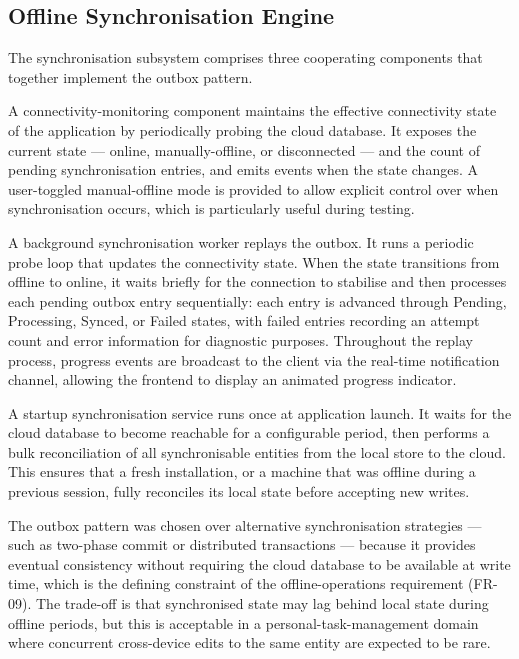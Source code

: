 \subsection{Offline Synchronisation Engine}\label{sec:meth_sync}

The synchronisation subsystem comprises three cooperating components that
together implement the outbox pattern.

A connectivity-monitoring component maintains the effective connectivity state
of the application by periodically probing the cloud database. It exposes the
current state --- online, manually-offline, or disconnected --- and the count
of pending synchronisation entries, and emits events when the state changes.
A user-toggled manual-offline mode is provided to allow explicit control over
when synchronisation occurs, which is particularly useful during testing.

A background synchronisation worker replays the outbox. It runs a periodic
probe loop that updates the connectivity state. When the state transitions from
offline to online, it waits briefly for the connection to stabilise and then
processes each pending outbox entry sequentially: each entry is advanced through
Pending, Processing, Synced, or Failed states, with failed entries recording an
attempt count and error information for diagnostic purposes. Throughout the
replay process, progress events are broadcast to the client via the real-time
notification channel, allowing the frontend to display an animated progress
indicator.

A startup synchronisation service runs once at application launch. It waits for
the cloud database to become reachable for a configurable period, then performs
a bulk reconciliation of all synchronisable entities from the local store to
the cloud. This ensures that a fresh installation, or a machine that was offline
during a previous session, fully reconciles its local state before accepting new
writes.

The outbox pattern was chosen over alternative synchronisation strategies ---
such as two-phase commit or distributed transactions --- because it provides
eventual consistency without requiring the cloud database to be available at
write time, which is the defining constraint of the offline-operations
requirement (FR-09). The trade-off is that synchronised state may lag behind
local state during offline periods, but this is acceptable in a
personal-task-management domain where concurrent cross-device edits to the
same entity are expected to be rare.

